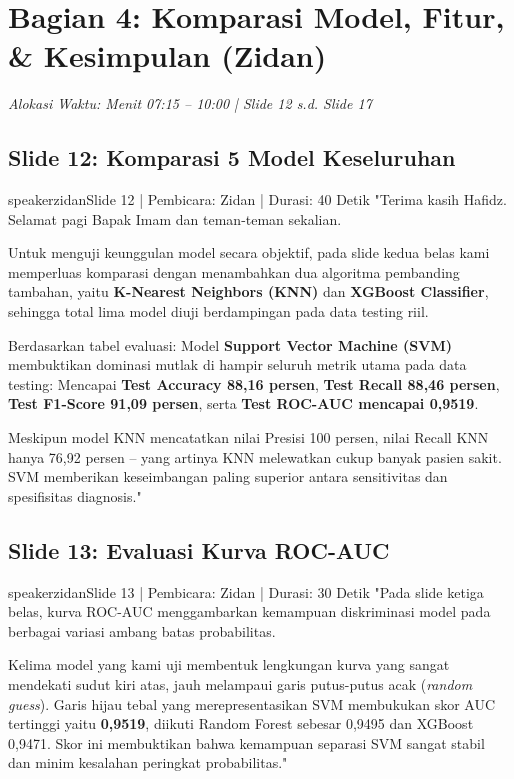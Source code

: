 \documentclass[11pt,a4paper]{article}
\begin{document}
\section{Bagian 4: Komparasi Model, Fitur, \& Kesimpulan (Zidan)}
\textit{Alokasi Waktu: Menit 07:15 -- 10:00 | Slide 12 s.d. Slide 17}

\subsection{Slide 12: Komparasi 5 Model Keseluruhan}
\begin{scriptbox}{speakerzidan}{Slide 12 | Pembicara: Zidan | Durasi: 40 Detik}
"Terima kasih Hafidz. Selamat pagi Bapak Imam dan teman-teman sekalian.

Untuk menguji keunggulan model secara objektif, pada slide kedua belas kami memperluas komparasi dengan menambahkan dua algoritma pembanding tambahan, yaitu \textbf{K-Nearest Neighbors (KNN)} dan \textbf{XGBoost Classifier}, sehingga total lima model diuji berdampingan pada data testing riil.

Berdasarkan tabel evaluasi:
Model \textbf{Support Vector Machine (SVM)} membuktikan dominasi mutlak di hampir seluruh metrik utama pada data testing:
Mencapai \textbf{Test Accuracy 88,16 persen}, \textbf{Test Recall 88,46 persen}, \textbf{Test F1-Score 91,09 persen}, serta \textbf{Test ROC-AUC mencapai 0,9519}.

Meskipun model KNN mencatatkan nilai Presisi 100 persen, nilai Recall KNN hanya 76,92 persen -- yang artinya KNN melewatkan cukup banyak pasien sakit. SVM memberikan keseimbangan paling superior antara sensitivitas dan spesifisitas diagnosis."
\end{scriptbox}

\subsection{Slide 13: Evaluasi Kurva ROC-AUC}
\begin{scriptbox}{speakerzidan}{Slide 13 | Pembicara: Zidan | Durasi: 30 Detik}
"Pada slide ketiga belas, kurva ROC-AUC menggambarkan kemampuan diskriminasi model pada berbagai variasi ambang batas probabilitas.

Kelima model yang kami uji membentuk lengkungan kurva yang sangat mendekati sudut kiri atas, jauh melampaui garis putus-putus acak (\textit{random guess}).
Garis hijau tebal yang merepresentasikan SVM membukukan skor AUC tertinggi yaitu \textbf{0,9519}, diikuti Random Forest sebesar 0,9495 dan XGBoost 0,9471. 
Skor ini membuktikan bahwa kemampuan separasi SVM sangat stabil dan minim kesalahan peringkat probabilitas."
\end{scriptbox}
\end{document}
